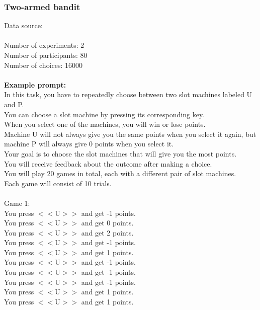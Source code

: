 \documentclass[pdflatex,sn-nature]{sn-jnl}%
\theoremstyle{thmstyleone}%
\theoremstyle{thmstyletwo}%
\theoremstyle{thmstylethree}%
\begin{document}
\subsubsection*{Two-armed bandit}
Data source: \cite{gershman2018deconstructing} \\ $~$ \\ 
Number of experiments: 2 $~$\\ 
Number of participants: 80 $~$\\ 
Number of choices: 16000 $~$\\ 
 $~$\\ 
\textbf{Example prompt:}
 $~$\\ 
In this task, you have to repeatedly choose between two slot machines labeled U and P. $~$\\ 
You can choose a slot machine by pressing its corresponding key. $~$\\ 
When you select one of the machines, you will win or lose points. $~$\\ 
Machine U will not always give you the same points when you select it again, but machine P will always give 0 points when you select it. $~$\\ 
Your goal is to choose the slot machines that will give you the most points. $~$\\ 
You will receive feedback about the outcome after making a choice. $~$\\ 
You will play 20 games in total, each with a different pair of slot machines. $~$\\ 
Each game will consist of 10 trials. $~$\\ 
 $~$\\ 
Game 1: $~$\\ 
You press $<<$U$>>$ and get -1 points. $~$\\ 
You press $<<$U$>>$ and get 0 points. $~$\\ 
You press $<<$U$>>$ and get 2 points. $~$\\ 
You press $<<$U$>>$ and get -1 points. $~$\\ 
You press $<<$U$>>$ and get 1 points. $~$\\ 
You press $<<$U$>>$ and get -1 points. $~$\\ 
You press $<<$U$>>$ and get -1 points. $~$\\ 
You press $<<$U$>>$ and get -1 points. $~$\\ 
You press $<<$U$>>$ and get 1 points. $~$\\ 
You press $<<$U$>>$ and get 1 points. $~$\\ 
\end{document}

